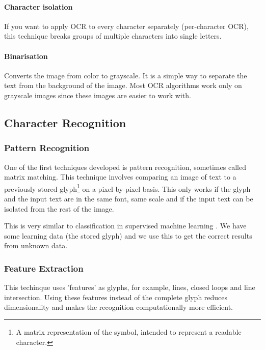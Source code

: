 \documentclass[12pt]{article}
\begin{document}
\paragraph{Character isolation}

If you want to apply OCR to every character separately (per-character OCR), this technique breaks groups of multiple characters into single letters.

\paragraph{Binarisation}

Converts the image from color to grayscale. It is a simple way to separate the text from the background of the image. Most OCR algorithms work only on grayscale images since these images are easier to work with. 

\subsection{Character Recognition}

\subsubsection{Pattern Recognition}

One of the first techniques developed is pattern recognition, sometimes called matrix matching. This technique involves comparing an image of text to a previously stored glyph\footnote{A matrix representation of the symbol, intended to represent a readable character.} on a pixel-by-pixel basis. This only works if the glyph and the input text are in the same font, same scale and if the input text can be isolated from the rest of the image.
\newline

This is very similar to classification in supervised machine learning . We have some learning data (the stored glyph) and we use this to get the correct results from unknown data.

\subsubsection{Feature Extraction}

This techinque uses 'features' as glyphs, for example, lines, closed loops and line intersection. Using these features instead of the complete glyph reduces dimensionality and makes the recognition computationally more efficient.
\newline
\end{document}
